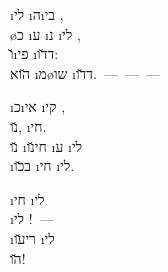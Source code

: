  \i{לי} \i{ה}\i{בי}  ,\\
\o{כ} \i{ע} \i{נ} \i{לי} ,\\
  \u{ו}\i{פי} \i{ד}\u{דו}:\\
 \u{הוא} \i{מ}\o{שו}  \i{ד}\u{דו}.~—~—~—

\i{כ}\i{אי} \i{קי}   ,\\
 \u{נו},  \i{חי}.\\
  \u{נו} \i{חי}\u{נו} \i{ע} \i{לי}\\
\i{ב}\u{כו} \i{חי}   \i{לי}.

\i{חי}  \i{לי}\\
 \i{לי} !~—\\
\i{רי}\u{עו} \i{לי}\\
 \u{הו}!
